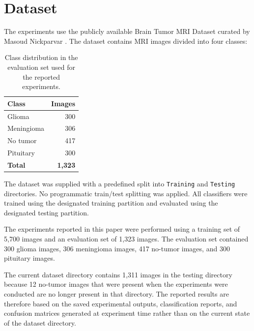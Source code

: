 \documentclass[11pt,a4paper]{article}
\begin{document}

\section{Dataset}

The experiments use the publicly available Brain Tumor MRI Dataset curated by Masoud Nickparvar \cite{nickparvar_dataset}. The dataset contains MRI images divided into four classes:

\begin{table}[H]
\centering
\caption{Class distribution in the evaluation set used for the reported experiments.}
\label{tab:class_distribution}
\begin{tabular}{lr}
\toprule
\textbf{Class} & \textbf{Images} \\
\midrule
Glioma & 300 \\
Meningioma & 306 \\
No tumor & 417 \\
Pituitary & 300 \\
\midrule
\textbf{Total} & \textbf{1,323} \\
\bottomrule
\end{tabular}
\end{table}

The dataset was supplied with a predefined split into \texttt{Training} and \texttt{Testing} directories. No programmatic train/test splitting was applied. All classifiers were trained using the designated training partition and evaluated using the designated testing partition.

The experiments reported in this paper were performed using a training set of 5,700 images and an evaluation set of 1,323 images. The evaluation set contained 300 glioma images, 306 meningioma images, 417 no-tumor images, and 300 pituitary images.

The current dataset directory contains 1,311 images in the testing directory because 12 no-tumor images that were present when the experiments were conducted are no longer present in that directory. The reported results are therefore based on the saved experimental outputs, classification reports, and confusion matrices generated at experiment time rather than on the current state of the dataset directory.

\end{document}
